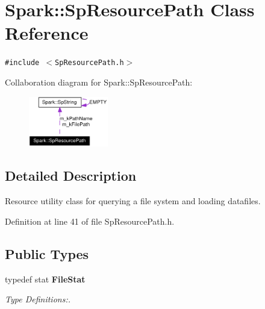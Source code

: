\section{Spark::Sp\-Resource\-Path Class Reference}
\label{classSpark_1_1SpResourcePath}
{\tt \#include $<$Sp\-Resource\-Path.h$>$}

Collaboration diagram for Spark::Sp\-Resource\-Path:\begin{figure}[H]
\begin{center}
\leavevmode
\includegraphics[width=98pt]{classSpark_1_1SpResourcePath__coll__graph}
\end{center}
\end{figure}


\subsection{Detailed Description}
Resource utility class for querying a file system and loading datafiles. 

Definition at line 41 of file Sp\-Resource\-Path.h.\subsection*{Public Types}
\begin{CompactItemize}
\item 
typedef stat {\bf File\-Stat}
\begin{CompactList}\small\item\em Type Definitions:. \item\end{CompactList}\end{CompactItemize}
